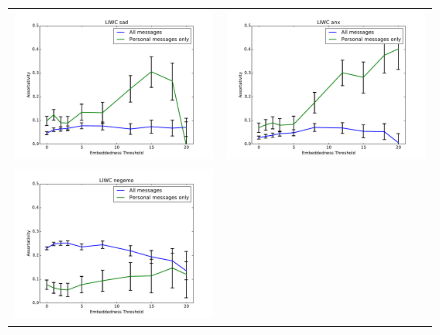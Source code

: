 \documentclass[11pt]{article}
\begin{document}
\begin{figure}
\centering
\begin{tabular}{cc}
\includegraphics[scale=.2]{sad_corr.pdf} &
\includegraphics[scale=.2]{anx_corr.pdf} \\
\includegraphics[scale=.2]{negemo_corr.pdf} &

\end{tabular}
\end{figure}
\end{document}
